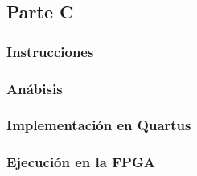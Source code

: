 \documentclass[../procedimientos.tex]{subfiles}
\begin{document}
\clearpage
\subsection{Parte C}
\subsubsection{Instrucciones}
\subsubsection{Anábisis}\label{subs:analisis_c}
\subsubsection{Implementación en Quartus}\label{subs:c_imp}
\subsubsection{Ejecución en la FPGA}
\end{document}
